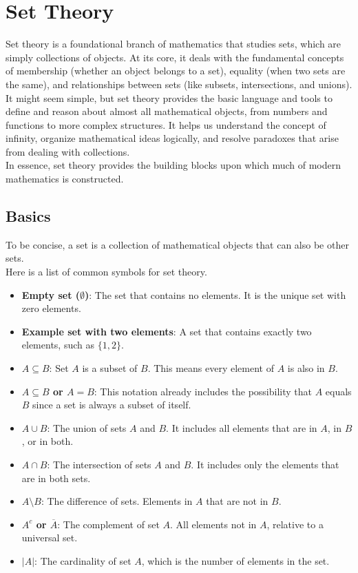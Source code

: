 \section{Set Theory}
Set theory is a foundational branch of mathematics that studies sets, which are simply collections of objects. At its core, it deals with the fundamental concepts of membership (whether an object belongs to a set), equality (when two sets are the same), and relationships between sets (like subsets, intersections, and unions).\\
It might seem simple, but set theory provides the basic language and tools to define and reason about almost all mathematical objects, from numbers and functions to more complex structures. It helps us understand the concept of infinity, organize mathematical ideas logically, and resolve paradoxes that arise from dealing with collections.\\
In essence, set theory provides the building blocks upon which much of modern mathematics is constructed.


\subsection{Basics}
To be concise, a set is a collection of mathematical objects that can also be other sets.\\
Here is a list of common symbols for set theory.

\begin{itemize}[label=$-$]
	\item \textbf{Empty set ($\emptyset$)}: The set that contains no elements. It is the unique set with zero elements.

	\item \textbf{Example set with two elements}: A set that contains exactly two elements, such as $\{1, 2\}$.

	\item \textbf{$A \subseteq B$}: Set $A$ is a subset of $B$. This means every element of $A$ is also in $B$.

	\item \textbf{$A \subseteq B$ or $A = B$}: This notation already includes the possibility that $A$ equals $B$ since a set is always a subset of itself.

	\item \textbf{$A \cup B$}: The union of sets $A$ and $B$. It includes all elements that are in $A$, in $B$, or in both.

	\item \textbf{$A \cap B$}: The intersection of sets $A$ and $B$. It includes only the elements that are in both sets.

	\item \textbf{$A \setminus B$}: The difference of sets. Elements in $A$ that are not in $B$.

	\item \textbf{$A^c$ or $\overline{A}$}: The complement of set $A$. All elements not in $A$, relative to a universal set.

	\item \textbf{$|A|$}: The cardinality of set $A$, which is the number of elements in the set.
\end{itemize}


